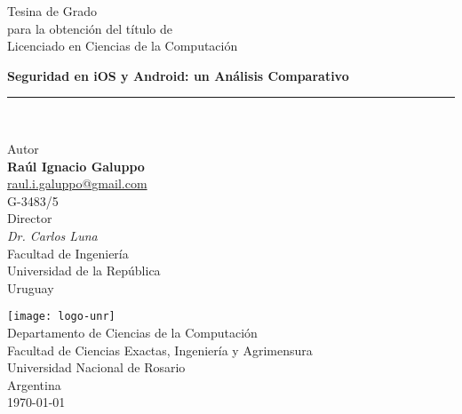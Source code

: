 \begin{titlepage}
    \begin{center}
        \LARGE
        Tesina de Grado\\
        \Large
        para la obtenci\'on del t\'itulo de\\
        Licenciado en Ciencias de la Computaci\'on
        \vfill
        
        \Huge
        \textbf{Seguridad en iOS y Android: un Análisis Comparativo}
        \rule{\textwidth}{1pt}\\
        \vspace{0.5cm}

        \large
        Autor\\
        \Large
        \textbf{Raúl Ignacio Galuppo}\\
        \normalsize
        \href{mailto:raul.i.galuppo@gmail.com}{raul.i.galuppo@gmail.com}\\
        G-3483/5\\
        \vspace{0.5cm}
        \large
        Director\\
        \Large
        \emph{Dr. Carlos Luna}\\
        \vspace{0.1cm}
        \normalsize
        Facultad de Ingeniería\\
        Universidad de la República\\
        Uruguay\\
        \vfill
        
        \texttt{[image: logo-unr]}\\
        \Large
        Departamento de Ciencias de la Computación\\
        Facultad de Ciencias Exactas, Ingeniería y Agrimensura\\
        Universidad Nacional de Rosario\\
        Argentina\\
        \vspace{0.5cm}
        \monthyeardate\today
    \end{center}
\end{titlepage}